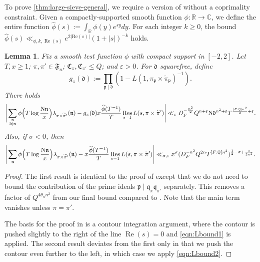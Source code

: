 \documentclass[11pt]{amsart}
\newtheorem{lemma}[theorem]{Lemma}
\theoremstyle{remark}
\numberwithin{equation}{section}
\renewcommand{\d}{\mathfrak{d}}
\newcommand{\p}{\mathfrak{p}}
\newcommand{\n}{\mathfrak{n}}
\newcommand{\q}{\mathfrak{q}}
\newcommand{\F}{\mathfrak{F}}
\newcommand{\N}{\textnormal{N}}
\newcommand{\R}{\mathbb{R}}
\newcommand{\Q}{\mathbb{Q}}
\renewcommand{\Re}{\textnormal{Re}}
\renewcommand{\hat}{\widehat}
\renewcommand{\tilde}{\widetilde}
\newcommand{\Res}{\textnormal{Res}}
\newcommand{\re}{\mathop{\mathrm{Re}}}
\renewcommand{\Re}{\mathop{\mathrm{Re}}}
\renewcommand{\epsilon}{\varepsilon}
\begin{document}
To prove \cref{thm:large-sieve-general}, we require a version of \cite[Lemma 4.1]{TZ_GLn} without a coprimality constraint.  Given a compactly-supported smooth function $\phi\colon \R \to \mathbb{C}$, we define the entire function $\hat\phi(s) := \int_\R \phi(y) e^{sy} dy$.  For each integer $k\geq 0$, the bound $\hat\phi(s) \ll_{\phi,k,\Re(s)} e^{2|\mathrm{Re}(s)|} (1 + |s|)^{-k}$ holds.

\begin{lemma}
\label{lem:rs-sums}
    Fix a smooth test function $\phi$ with compact support in $[-2, 2]$.  Let $T, x \ge 1$; $\pi, \pi' \in \F_n$; $\mathfrak{C}_{\pi}, \mathfrak{C}_{\pi'} \le Q$; and $\epsilon>0$. For $\d$ squarefree, define
    \begin{equation} \label{eqn:g-pi-notation}
        g_\pi(\d)
        := 
        \prod_{\p \mid \d} (1 - L(1, \pi_\p \times \tilde \pi_\p)^{-1}).
    \end{equation}
   There holds
    \[
        \Bigg|\sum_{\substack{\n \\ \d \mid \n}} \phi\Big(T \log \frac{\N \n}{x}\Big)
        \lambda_{\pi \times \tilde\pi'}(\n)
        -
        g_\pi(\d) x
        \frac{\hat\phi(T^{-1})}{T}
        \mathop{\Res}_{s = 1} L(s, \pi \times \tilde \pi')\Bigg|\ll_{\epsilon}D_F^{-\frac{n^2}{2}}Q^{n+\epsilon} \N\d^{n^2+\epsilon} T^{\frac{[F:\Q]n^2}{2}+\epsilon}.
    \]
    Also, if $\sigma<0$, then
    \[
        \Bigg|\sum_{\substack{\n}} \phi\Big(T \log \frac{\N \n}{x}\Big)
        \lambda_{\pi \times \tilde\pi'}(\n)
        -
        x
        \frac{\hat\phi(T^{-1})}{T}
        \mathop{\Res}_{s = 1} L(s, \pi \times \tilde \pi')\Bigg|\ll_{\sigma,\epsilon}
        x^{\sigma}(D_F^{-n^2}Q^{2n} T^{[F:\Q]n^2})^{\frac{1}{2}-\sigma+\frac{\epsilon}{2n^2}}.
    \]
\end{lemma}

\begin{proof}
The first result is identical to the proof of \cite[Lemma 4.1]{TZ_GLn} except that we do not need to bound the contribution of the prime ideals $\p \mid \q_\pi \q_{\pi'}$ separately.  This removes a factor of $Q^{4\theta_n n^2}$ from our final bound compared to \cite{TZ_GLn}. Note that the main term vanishes unless $\pi = \pi'$.

The basis for the proof in \cite{TZ_GLn} is a contour integration argument, where the contour is pushed slightly to the right of the line $\re(s)=0$ and \eqref{eqn:Lbound1} is applied.  The second result deviates from the first only in that we push the contour even further to the left, in which case we apply \eqref{eqn:Lbound2}.
\end{proof}
\end{document}
